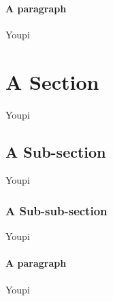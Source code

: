 \paragraph{A paragraph}
%
Youpi

\section{A Section}
%
Youpi

\subsection{A Sub-section}
%
Youpi

\subsubsection{A Sub-sub-section}
%
Youpi

\paragraph{A paragraph}
%
Youpi